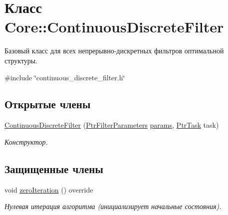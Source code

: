 \hypertarget{class_core_1_1_continuous_discrete_filter}{}\section{Класс Core\+:\+:Continuous\+Discrete\+Filter}
\label{class_core_1_1_continuous_discrete_filter}


Базовый класс для всех непрерывно-\/дискретных фильтров оптимальной структуры.  




{\ttfamily \#include \char`\"{}continuous\+\_\+discrete\+\_\+filter.\+h\char`\"{}}

\subsection*{Открытые члены}
\begin{DoxyCompactItemize}
\item 
\hyperlink{class_core_1_1_continuous_discrete_filter_a07811c4d421be2383961078cd07e6d96}{Continuous\+Discrete\+Filter} (\hyperlink{namespace_core_a4811af8148ba137d644b9a61a042cf03}{Ptr\+Filter\+Parameters} \hyperlink{class_core_1_1_filter_a44aa749b49ba46256975ce545531ecf7}{params}, \hyperlink{namespace_core_abfda8f69fcacfcea2696549b548ed737}{Ptr\+Task} task)\hypertarget{class_core_1_1_continuous_discrete_filter_a07811c4d421be2383961078cd07e6d96}{}\label{class_core_1_1_continuous_discrete_filter_a07811c4d421be2383961078cd07e6d96}

\begin{DoxyCompactList}\small\item\em Конструктор. \end{DoxyCompactList}\end{DoxyCompactItemize}
\subsection*{Защищенные члены}
\begin{DoxyCompactItemize}
\item 
void \hyperlink{class_core_1_1_continuous_discrete_filter_acc9b18241a13d46dc92ef1f02ec13e53}{zero\+Iteration} () override
\begin{DoxyCompactList}\small\item\em Нулевая итерация алгоритма (инициализирует начальные состояния). \end{DoxyCompactList}\end{DoxyCompactItemize}
